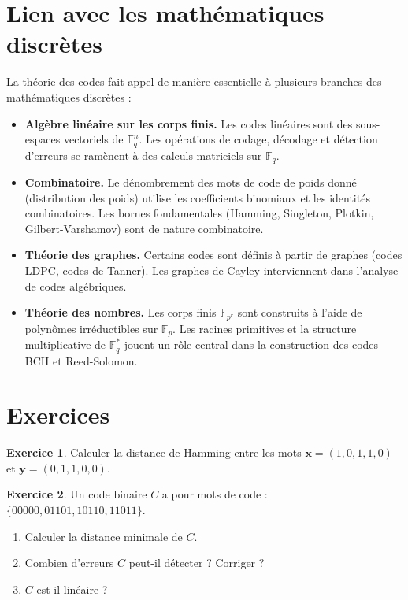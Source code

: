 \documentclass[12pt,a4paper,openany]{book}
\theoremstyle{definition}
\newtheorem{exercice}{Exercice}[chapter]
\theoremstyle{plain}
\theoremstyle{remark}
\begin{document}
\section{Lien avec les mathématiques discrètes}
\label{sec:codes-maths-discretes}

La théorie des codes fait appel de manière essentielle à plusieurs
branches des mathématiques discrètes :

\begin{itemize}
  \item \textbf{Algèbre linéaire sur les corps finis.}\;
  Les codes linéaires sont des sous-espaces vectoriels de
  $\mathbb{F}_q^n$. Les opérations de codage, décodage et détection
  d'erreurs se ramènent à des calculs matriciels sur $\mathbb{F}_q$.

  \item \textbf{Combinatoire.}\;
  Le dénombrement des mots de code de poids donné (distribution des poids)
  utilise les coefficients binomiaux et les identités combinatoires. Les
  bornes fondamentales (Hamming, Singleton, Plotkin, Gilbert-Varshamov)
  sont de nature combinatoire.

  \item \textbf{Théorie des graphes.}\;
  Certains codes sont définis à partir de graphes (codes LDPC, codes
  de Tanner). Les graphes de Cayley interviennent dans l'analyse de
  codes algébriques.

  \item \textbf{Théorie des nombres.}\;
  Les corps finis $\mathbb{F}_{p^r}$ sont construits à l'aide de
  polynômes irréductibles sur $\mathbb{F}_p$. Les racines primitives
  et la structure multiplicative de $\mathbb{F}_q^*$ jouent un rôle
  central dans la construction des codes BCH et Reed-Solomon.
\end{itemize}

\section{Exercices}
\label{sec:exo-ch11}

\begin{exercice}
Calculer la distance de Hamming entre les mots $\mathbf{x} = (1,0,1,1,0)$
et $\mathbf{y} = (0,1,1,0,0)$.
\end{exercice}

\begin{exercice}
Un code binaire $C$ a pour mots de code :
$\{00000, 01101, 10110, 11011\}$.
\begin{enumerate}[label=(\alph*)]
  \item Calculer la distance minimale de $C$.
  \item Combien d'erreurs $C$ peut-il détecter ? Corriger ?
  \item $C$ est-il linéaire ?
\end{enumerate}
\end{exercice}
\end{document}
